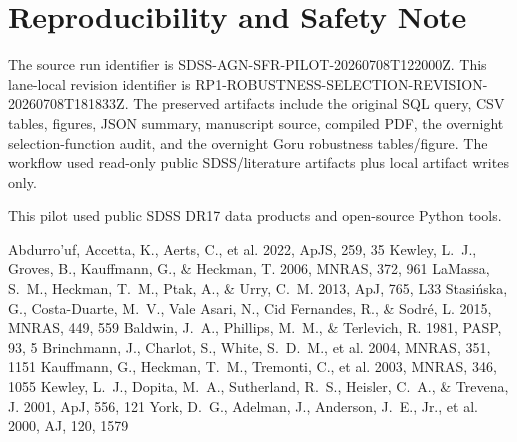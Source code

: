 \documentclass[twocolumn]{aastex631}
\begin{document}
\section*{Reproducibility and Safety Note}
The source run identifier is SDSS-AGN-SFR-PILOT-20260708T122000Z.  This lane-local revision identifier is RP1-ROBUSTNESS-SELECTION-REVISION-20260708T181833Z.  The preserved artifacts include the original SQL query, CSV tables, figures, JSON summary, manuscript source, compiled PDF, the overnight selection-function audit, and the overnight Goru robustness tables/figure.  The workflow used read-only public SDSS/literature artifacts plus local artifact writes only.

\acknowledgments
This pilot used public SDSS DR17 data products and open-source Python tools.

\begin{thebibliography}{}

 Abdurro'uf, Accetta, K., Aerts, C., et al. 2022, ApJS, 259, 35
 Kewley, L.~J., Groves, B., Kauffmann, G., \& Heckman, T. 2006, MNRAS, 372, 961
 LaMassa, S.~M., Heckman, T.~M., Ptak, A., \& Urry, C.~M. 2013, ApJ, 765, L33
 Stasi\'nska, G., Costa-Duarte, M.~V., Vale Asari, N., Cid Fernandes, R., \& Sodr\'e, L. 2015, MNRAS, 449, 559
 Baldwin, J.~A., Phillips, M.~M., \& Terlevich, R. 1981, PASP, 93, 5
 Brinchmann, J., Charlot, S., White, S.~D.~M., et al. 2004, MNRAS, 351, 1151
 Kauffmann, G., Heckman, T.~M., Tremonti, C., et al. 2003, MNRAS, 346, 1055
 Kewley, L.~J., Dopita, M.~A., Sutherland, R.~S., Heisler, C.~A., \& Trevena, J. 2001, ApJ, 556, 121
 York, D.~G., Adelman, J., Anderson, J.~E., Jr., et al. 2000, AJ, 120, 1579
\end{thebibliography}
\end{document}
